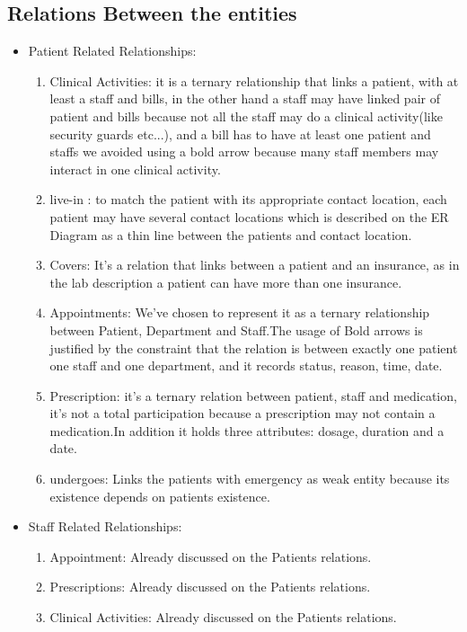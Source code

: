 \documentclass[a4paper,12pt]{article}
\begin{document}
\subsection{Relations Between the entities}
\begin{itemize}
    \item Patient Related Relationships:
    \begin{enumerate}
        \item Clinical Activities: it is a ternary relationship that links a patient, with at least a staff and bills, in the other hand a staff may have linked pair of patient and bills because not all the staff may do a clinical activity(like security guards etc...), and a bill has to have at least one patient and staffs we avoided using a bold arrow because many staff members may interact in one clinical activity.
        \item live-in : to match the patient with its appropriate contact location, each patient may have several contact locations which is described on the ER Diagram as a thin line between the patients and contact location. 
        \item Covers: It's a relation that links between a patient and an insurance, as in the lab description a patient can have more than one insurance.
        \item Appointments: We've chosen to represent it as a ternary relationship between Patient, Department and Staff.The usage of Bold arrows is justified by the constraint that the relation is between exactly one patient one staff and one department, and it records status, reason, time, date.
        \item Prescription: it's a ternary relation between patient, staff and medication, it's not a total participation because a prescription may not contain a medication.In addition it holds three attributes: dosage, duration and a date.
        \item undergoes: Links the patients with emergency as weak entity because its existence depends on patients existence.
    \end{enumerate}
    \item Staff Related Relationships:
    \begin{enumerate}
        \item Appointment: Already discussed on the Patients relations.
        \item Prescriptions: Already discussed on the Patients relations.
        \item Clinical Activities: Already discussed on the Patients relations.

\end{enumerate}
\end{itemize}
\end{document}

